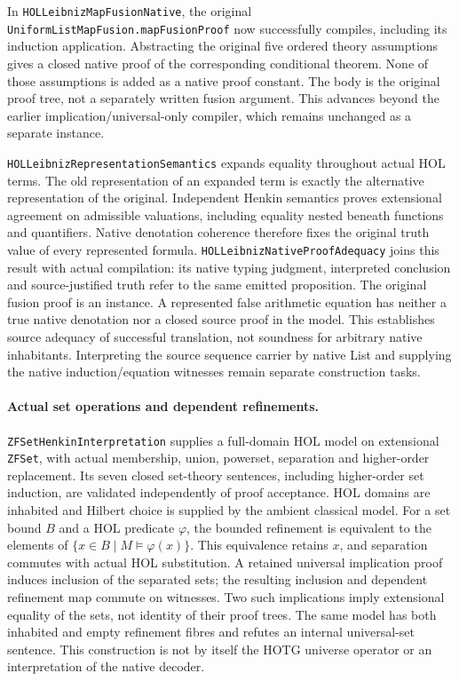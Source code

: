 \documentclass[11pt]{article}
\theoremstyle{definition}
\theoremstyle{remark}
\begin{document}
In \nolinkurl{HOLLeibnizMapFusionNative}, the original
\nolinkurl{UniformListMapFusion.mapFusionProof} now successfully compiles,
including its induction application. Abstracting the original five ordered
theory assumptions gives a closed native proof of the corresponding
conditional theorem. None of those assumptions is added as a native proof
constant. The body is the original proof tree, not a separately written
fusion argument. This advances beyond the earlier implication/universal-only
compiler, which remains unchanged as a separate instance.

\nolinkurl{HOLLeibnizRepresentationSemantics} expands equality throughout
actual HOL terms. The old representation of an expanded term is exactly
the alternative representation of the original. Independent Henkin
semantics proves extensional agreement on admissible valuations, including
equality nested beneath functions and quantifiers. Native denotation
coherence therefore fixes the original truth value of every represented
formula. \nolinkurl{HOLLeibnizNativeProofAdequacy} joins this result with
actual compilation: its native typing judgment, interpreted conclusion and
source-justified truth refer to the same emitted proposition. The original
fusion proof is an instance. A represented false arithmetic equation has
neither a true native denotation nor a closed source proof in the model.
This establishes source adequacy of successful translation, not soundness
for arbitrary native inhabitants. Interpreting the source sequence carrier
by native List and supplying the native induction/equation witnesses remain
separate construction tasks.

\paragraph{Actual set operations and dependent refinements.}
\nolinkurl{ZFSetHenkinInterpretation} supplies a full-domain HOL model on
extensional \nolinkurl{ZFSet}, with actual membership, union, powerset,
separation and higher-order replacement. Its seven closed set-theory
sentences, including higher-order set induction, are validated independently
of proof acceptance. HOL domains are inhabited and Hilbert choice is supplied
by the ambient classical model. For a set bound \(B\) and a HOL predicate
\(\varphi\), the bounded refinement is equivalent to the elements of
\(\{x\in B\mid M\models\varphi(x)\}\). This equivalence retains \(x\),
and separation commutes with actual HOL substitution. A retained universal
implication proof induces inclusion of the separated sets; the resulting
inclusion and dependent refinement map commute on witnesses. Two such
implications imply extensional equality of the sets, not identity of their
proof trees. The same model has both inhabited and empty refinement fibres
and refutes an internal universal-set sentence. This construction is not
by itself the HOTG universe operator or an interpretation of the native decoder.
\end{document}
